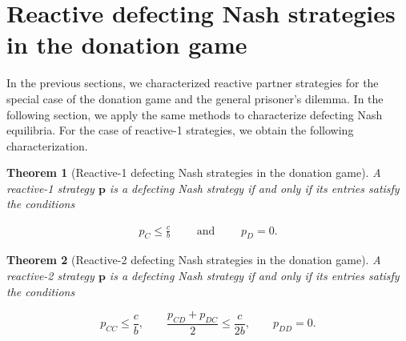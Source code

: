 \documentclass[11pt]{article}
\theoremstyle{plainCl1}
\newtheorem{theorem}{Theorem}
\theoremstyle{plainCl2}
\begin{document}

\section{Reactive defecting Nash strategies in the donation game}\label{section:defecting_donation_game}

In the previous sections, we characterized reactive partner strategies for the
special case of the donation game and the general prisoner's dilemma. In the
following section, we apply the same methods to characterize defecting Nash
equilibria. For the case of reactive-1 strategies, we obtain the following
characterization.


\begin{theorem}[Reactive-1 defecting Nash strategies in the donation game]
\label{theorem:reactive_one_defecting_strategies}
A reactive-1 strategy $\mathbf{p}$ is a defecting Nash strategy if and only if
its entries satisfy the conditions

\begin{equation}
  \begin{array}{rcl}
    p_{C} \le  \frac{c}{b} \qquad \text{ and } \qquad  p_{D} \!=\! 0.
\end{array}
\end{equation}
\end{theorem}



\begin{theorem}[Reactive-2 defecting Nash strategies in the donation game]
\label{theorem:reactive_two_defecting_strategies}
A reactive-2 strategy $\mathbf{p}$ is a defecting Nash strategy if and only if
its entries satisfy the conditions

\begin{equation}\label{eq:defecting_conditions_two}
  p_{CC} \le \frac{c}{b}, \qquad \displaystyle \frac{p_{CD} \!+\! p_{DC}}{2} \le \frac{c}{2b}, \qquad p_{DD} = 0.
\end{equation}
\end{theorem}

\end{document}
